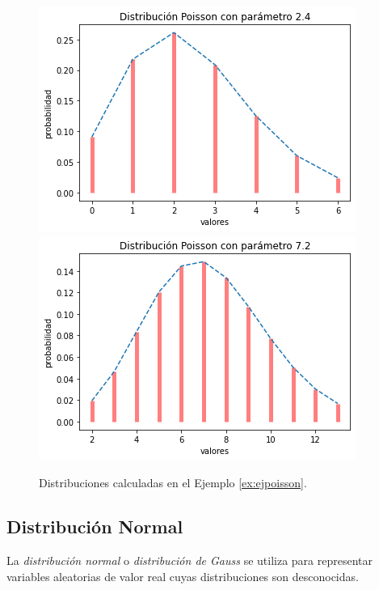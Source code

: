 \documentclass[oneside,openright,titlepage,numbers=noenddot,openany,headinclude,footinclude=true,
cleardoublepage=empty,abstractoff,BCOR=5mm,paper=a4,fontsize=12pt,main=spanish]{scrreprt}
\begin{document}
\begin{figure}[h]
      \includegraphics[width=\linewidth]{images/poisson1.png}
    \endminipage\hfill
      \includegraphics[width=\linewidth]{images/poisson2.png}
    \endminipage
     \caption{Distribuciones calculadas en el Ejemplo \ref{ex:ejpoisson}.}
\end{figure}

\subsection{Distribución Normal}

La \textit{distribución normal} o  \textit{distribución de Gauss} se utiliza para representar variables aleatorias de valor real cuyas distribuciones son desconocidas.\\
\end{document}
